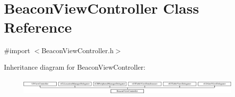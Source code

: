 \hypertarget{interface_beacon_view_controller}{}\section{Beacon\+View\+Controller Class Reference}
\label{interface_beacon_view_controller}


{\ttfamily \#import $<$Beacon\+View\+Controller.\+h$>$}

Inheritance diagram for Beacon\+View\+Controller\+:\begin{figure}[H]
\begin{center}
\leavevmode
\includegraphics[height=0.884676cm]{interface_beacon_view_controller}
\end{center}
\end{figure}
